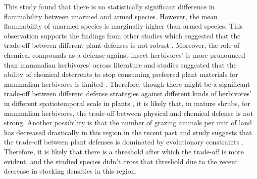 \documentclass[12pt]{report}
\begin{document}
This study found that there is no statistically significant difference in flammability between unarmed and armed species. However, the mean flammability of unarmed species is marginally higher than armed species. This observation supports the findings from other studies which suggested that the trade-off between different plant defenses is not robust \citep{steward1988there, koricheva2004meta, moles2013correlations}. Moreover, the role of chemical compounds as a defense against insect herbivores' \citep{herms1992dilemma, ohgushi2005indirect} is more pronounced than mammalian herbivores' across literature and
studies suggested that the ability of chemical deterrents to stop consuming preferred plant materials for mammalian herbivores is limited \citep{cooper1985condensed, cooper1988foliage}. Therefore, though there might be a significant trade-off between different defense strategies against different kinds of herbivores' in different spatiotemporal scale  in plants \citep{eck2001trade, wigley2015mammal, dostalek2016trade}, it is likely that, in mature shrubs, for mammalian herbivores, the trade-off between physical and chemical defense is not strong. Another possibility is that the number of grazing animals per unit of land has decreased drastically in this region in the recent past \citep{wilcox2012historicalgrazing2} and study suggests that  the trade-off between plant defenses is dominated by evolutionary constraints \citep{eichenberg2015trade}.  Therefore, it is likely that there is a threshold after which the
trade-off is more evident, and the studied species didn’t cross that threshold due to
the recent decrease in stocking densities in this region.




\end{document}
